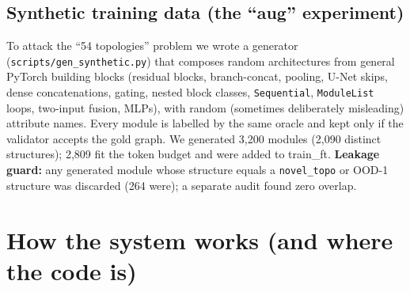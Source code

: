 \documentclass[11pt,a4paper]{article}
\begin{document}
\subsection{Synthetic training data (the ``aug'' experiment)}\label{sec:synth}
To attack the ``54 topologies'' problem we wrote a generator (\texttt{scripts/gen\_synthetic.py}) that composes random
architectures from general PyTorch building blocks (residual blocks, branch-concat, pooling, U-Net skips, dense
concatenations, gating, nested block classes, \texttt{Sequential}, \texttt{ModuleList} loops, two-input fusion, MLPs),
with random (sometimes deliberately misleading) attribute names. Every module is labelled by the same oracle and kept only
if the validator accepts the gold graph. We generated 3{,}200 modules (2{,}090 distinct structures); 2{,}809 fit the token
budget and were added to train\_ft. \textbf{Leakage guard:} any generated module whose structure equals a
\texttt{novel\_topo} or OOD-1 structure was discarded (264 were); a separate audit found zero overlap.

\section{How the system works (and where the code is)}\label{sec:system}
\end{document}
